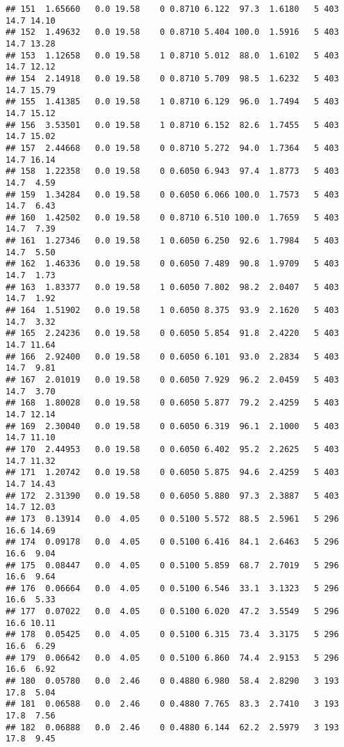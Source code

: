 \documentclass[
]{article}
\begin{document}
\begin{verbatim}
## 151  1.65660   0.0 19.58    0 0.8710 6.122  97.3  1.6180   5 403    14.7 14.10
## 152  1.49632   0.0 19.58    0 0.8710 5.404 100.0  1.5916   5 403    14.7 13.28
## 153  1.12658   0.0 19.58    1 0.8710 5.012  88.0  1.6102   5 403    14.7 12.12
## 154  2.14918   0.0 19.58    0 0.8710 5.709  98.5  1.6232   5 403    14.7 15.79
## 155  1.41385   0.0 19.58    1 0.8710 6.129  96.0  1.7494   5 403    14.7 15.12
## 156  3.53501   0.0 19.58    1 0.8710 6.152  82.6  1.7455   5 403    14.7 15.02
## 157  2.44668   0.0 19.58    0 0.8710 5.272  94.0  1.7364   5 403    14.7 16.14
## 158  1.22358   0.0 19.58    0 0.6050 6.943  97.4  1.8773   5 403    14.7  4.59
## 159  1.34284   0.0 19.58    0 0.6050 6.066 100.0  1.7573   5 403    14.7  6.43
## 160  1.42502   0.0 19.58    0 0.8710 6.510 100.0  1.7659   5 403    14.7  7.39
## 161  1.27346   0.0 19.58    1 0.6050 6.250  92.6  1.7984   5 403    14.7  5.50
## 162  1.46336   0.0 19.58    0 0.6050 7.489  90.8  1.9709   5 403    14.7  1.73
## 163  1.83377   0.0 19.58    1 0.6050 7.802  98.2  2.0407   5 403    14.7  1.92
## 164  1.51902   0.0 19.58    1 0.6050 8.375  93.9  2.1620   5 403    14.7  3.32
## 165  2.24236   0.0 19.58    0 0.6050 5.854  91.8  2.4220   5 403    14.7 11.64
## 166  2.92400   0.0 19.58    0 0.6050 6.101  93.0  2.2834   5 403    14.7  9.81
## 167  2.01019   0.0 19.58    0 0.6050 7.929  96.2  2.0459   5 403    14.7  3.70
## 168  1.80028   0.0 19.58    0 0.6050 5.877  79.2  2.4259   5 403    14.7 12.14
## 169  2.30040   0.0 19.58    0 0.6050 6.319  96.1  2.1000   5 403    14.7 11.10
## 170  2.44953   0.0 19.58    0 0.6050 6.402  95.2  2.2625   5 403    14.7 11.32
## 171  1.20742   0.0 19.58    0 0.6050 5.875  94.6  2.4259   5 403    14.7 14.43
## 172  2.31390   0.0 19.58    0 0.6050 5.880  97.3  2.3887   5 403    14.7 12.03
## 173  0.13914   0.0  4.05    0 0.5100 5.572  88.5  2.5961   5 296    16.6 14.69
## 174  0.09178   0.0  4.05    0 0.5100 6.416  84.1  2.6463   5 296    16.6  9.04
## 175  0.08447   0.0  4.05    0 0.5100 5.859  68.7  2.7019   5 296    16.6  9.64
## 176  0.06664   0.0  4.05    0 0.5100 6.546  33.1  3.1323   5 296    16.6  5.33
## 177  0.07022   0.0  4.05    0 0.5100 6.020  47.2  3.5549   5 296    16.6 10.11
## 178  0.05425   0.0  4.05    0 0.5100 6.315  73.4  3.3175   5 296    16.6  6.29
## 179  0.06642   0.0  4.05    0 0.5100 6.860  74.4  2.9153   5 296    16.6  6.92
## 180  0.05780   0.0  2.46    0 0.4880 6.980  58.4  2.8290   3 193    17.8  5.04
## 181  0.06588   0.0  2.46    0 0.4880 7.765  83.3  2.7410   3 193    17.8  7.56
## 182  0.06888   0.0  2.46    0 0.4880 6.144  62.2  2.5979   3 193    17.8  9.45

\end{verbatim}
\end{document}
